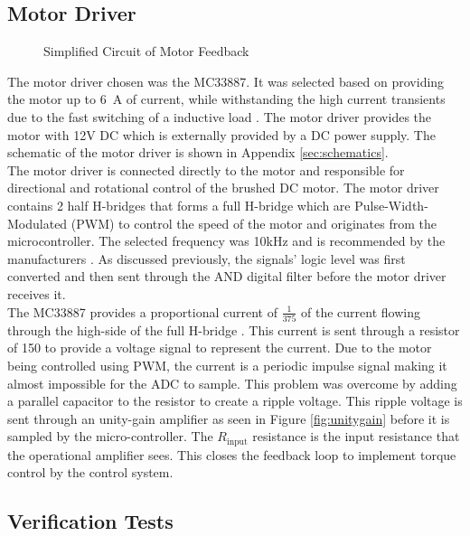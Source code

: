 \subsection{Motor Driver}
\begin{figure}[h]
	\centering
	
	\caption{Simplified Circuit of Motor Feedback}
	\label{fig:feedback_current}
\end{figure}


The motor driver chosen was the MC33887. It was selected based on providing the motor up to \SI{6}{\ampere} of current, while withstanding the high current transients due to the fast switching of a inductive load \citep{motorIC}. The motor driver provides the motor with 12V DC which is externally provided by a DC power supply. The schematic of the motor driver is shown in Appendix \ref{sec:schematics}.\\

The motor driver is connected directly to the motor and responsible for directional and rotational control of the brushed DC motor. The motor driver contains 2 half H-bridges that forms a full H-bridge which are Pulse-Width-Modulated (PWM) to control the speed of the motor and originates from the microcontroller. The selected frequency was 10kHz and is recommended by the manufacturers \citep{motorIC}. As discussed previously, the signals' logic level was first converted and then sent through the AND digital filter before the motor driver receives it.\\

The MC33887 provides a proportional current of $\frac{1}{375}$ of the current flowing through the high-side of the full H-bridge \citep{motorIC}. This current is sent through a resistor of \SI{150}{\Omega} to provide a voltage signal to represent the current. Due to the motor being controlled using PWM, the current is a periodic impulse signal making it almost impossible for the ADC to sample. This problem was overcome by adding a parallel capacitor to the resistor to create a ripple voltage. This ripple voltage is sent through an unity-gain amplifier as seen in Figure \ref{fig:unitygain} before it is sampled by the micro-controller. The $R_{\text{input}}$ resistance is the input resistance that the operational amplifier sees. This closes the feedback loop to implement torque control by the control system.\\

\subsection{Verification Tests}


